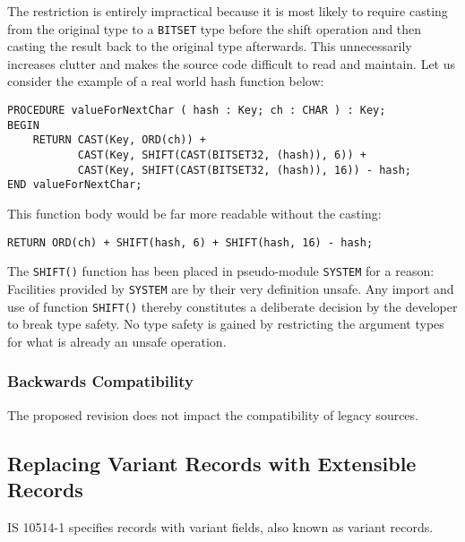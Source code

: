 \documentclass[10pt,a4paper,leqno,fleqn]{article}
\begin{document}
The restriction is entirely impractical because it is most likely to require casting
from the original type to a \verb|BITSET| type before the shift operation and
then casting the result back to the original type afterwards. This unnecessarily
increases clutter and makes the source code difficult to read and maintain.
Let us consider the example of a real world hash function below:

\lstset{style=modula2}
\begin{lstlisting}
PROCEDURE valueForNextChar ( hash : Key; ch : CHAR ) : Key;
BEGIN
    RETURN CAST(Key, ORD(ch)) +
           CAST(Key, SHIFT(CAST(BITSET32, (hash)), 6)) +
           CAST(Key, SHIFT(CAST(BITSET32, (hash)), 16)) - hash;
END valueForNextChar;
\end{lstlisting}

\noindent This function body would be far more readable without the casting:

\lstset{style=modula2}
\begin{lstlisting}
RETURN ORD(ch) + SHIFT(hash, 6) + SHIFT(hash, 16) - hash;
\end{lstlisting}

\noindent The \verb|SHIFT()| function has been placed in pseudo-module \verb|SYSTEM|
for a reason: Facilities provided by \verb|SYSTEM| are by their very definition
unsafe. Any import and use of function \verb|SHIFT()| thereby constitutes a
deliberate decision by the developer to break type safety. No type safety is
gained by restricting the argument types for what is already an unsafe
operation.

\subsubsection{Backwards Compatibility}

The proposed revision does not impact the compatibility of legacy sources.


\subsection{Replacing Variant Records with Extensible Records}

IS 10514-1 specifies records with variant fields, also known as variant records.
\end{document}
